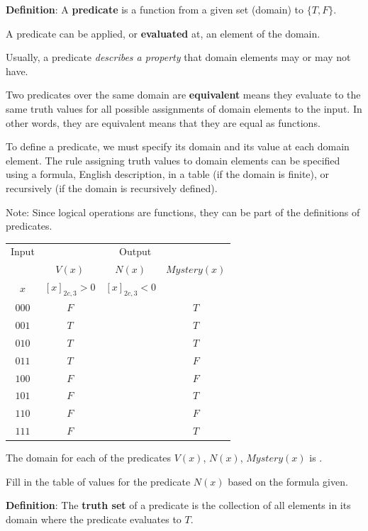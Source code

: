 \documentclass[12pt, oneside]{article}
\begin{document}
{\bf  Definition}: A  {\bf predicate}  is  a function from a given set (domain) to $\{T,F\}$.

A predicate can be applied, or {\bf evaluated} at, an element of the domain.

Usually, a predicate {\it describes a  property} that domain elements may or may not have.

Two predicates over the same domain are {\bf equivalent} means they evaluate to
the same truth values for all possible assignments of domain elements to the
input. In other words, they are equivalent means that they are equal as functions.

To define a predicate, we must specify its domain and its value at each domain element.
The rule assigning truth values to domain elements can be specified using a formula, 
English description, in a table (if the domain is finite), or recursively (if the domain is recursively
defined).

Note: Since logical operations are functions, they can be part of the definitions of predicates. 

\begin{center}
    \begin{tabular}{c||c|c|c}
    Input & \multicolumn{3}{c}{Output} \\
    &$V(x)$ & $N(x)$ & $Mystery(x)$\\
    $x$ & $[x]_{2c,3} > 0$ & $[x]_{2c,3} < 0$& \\
    \hline
    $000$  & $F$ & & $T$\\
    $001$  & $T$ & & $T$\\
    $010$  & $T$ & & $T$\\
    $011$  & $T$ & & $F$\\
    $100$  & $F$ & & $F$\\
    $101$  & $F$ & & $T$\\
    $110$  & $F$ & & $F$\\
    $111$  & $F$ & & $T$\\
    \end{tabular}
    \end{center}
    
    The domain for each of the predicates $V(x)$, $N(x)$, $Mystery(x)$ is
    \underline{}.

    Fill in the table of values for the predicate $N(x)$ based on the formula given. \vfill


{\bf Definition}: The {\bf truth  set} of a  predicate is the collection of all elements in its
domain where the predicate evaluates to $T$.
\end{document}
